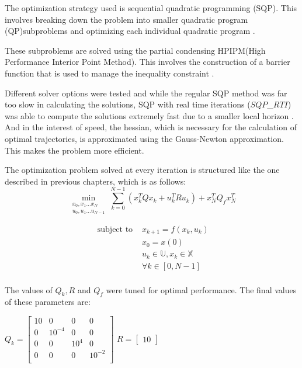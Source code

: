 The optimization strategy used is sequential quadratic programming (SQP). This involves breaking down the problem into smaller quadratic program (QP)subproblems and optimizing each individual quadratic program \cite{Nocedal2006}.

These subproblems are solved using the partial condensing HPIPM(High Performance Interior Point Method). This involves the construction of a barrier function that is used to manage the inequality constraint \cite{Nocedal2006}.

Different solver options were tested and while the regular SQP method was far too slow in calculating the solutions, SQP with real time iterations ($SQP$\_$RTI$) \cite{acados,Diehl2005} was able to compute the solutions extremely fast due to a smaller local horizon . And in the interest of speed, the hessian, which is necessary for the calculation of optimal trajectories, is approximated using the Gauss-Newton approximation. This makes the problem more efficient. 

The optimization problem solved at every iteration is structured like the one described in previous chapters, which is as follows:
\begin{equation}
	\underset{\substack{x_0,x_1...x_N \\ u_0,u_1...u_{N-1}}} {\operatorname{min}} \sum_{k=0}^{N-1}\left (x_{k}^{T} Q x_{k}+ u_{k}^{T} R u_{k}\right)+x_{N}^{T} Q_f x_{N}^{T}
\end{equation}

\begin{equation}
	\begin{array}{ll}
		\text { subject to } & x_{k+1} = f(x_k,u_k)  \\
		& x_0 = x(0) \\
		
		& u_k \in \mathbb{U}, x_k \in \mathbb{X} \\
		
		& \forall k \in[0, N-1] \\
	\end{array}
\end{equation}

The values of $Q_k, R$ and $Q_f$ were tuned for optimal performance. The final values of these parameters are:

\begin{center}
	$Q_k = \begin{bmatrix}
		10 & 0       & 0      & 0      \\                       
		0  & 10^{-4} & 0      & 0      \\
		0  & 0       & 10^{4} & 0      \\
		0  & 0       & 0      & 10^{-2}\\
	\end{bmatrix}
	$
	\hspace{2cm}
	$R = \begin{bmatrix}
		10
	\end{bmatrix}
	$
\end{center}

